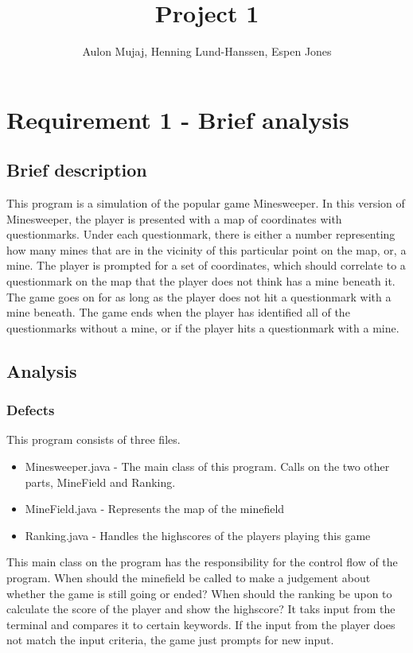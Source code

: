 \documentclass[UKenglish]{article}  %
\title{Project 1}        %
\author{Aulon Mujaj, Henning Lund-Hanssen, Espen Jones}                      %
\begin{document}
\maketitle{}

\section{Requirement 1 - Brief analysis}

\subsection{Brief description}
This program is a simulation of the popular game Minesweeper. In this version of
Minesweeper, the player is presented with a map of coordinates with
questionmarks. Under each questionmark, there is either a number representing
how many mines that are in the vicinity of this particular point on the map, or,
a mine. The player is prompted for a set of coordinates, which should correlate
to a questionmark on the map that the player does not think has a mine beneath
it. The game goes on for as long as the player does not hit a questionmark with
a mine beneath. The game ends when the player has identified all of the
questionmarks without a mine, or if the player hits a questionmark with a mine.
\subsection{Analysis}
\subsubsection{Defects}
This program consists of three files.

\begin{itemize}
    \item Minesweeper.java - The main class of this program. Calls on the two other parts, MineField and Ranking.
    \item MineField.java - Represents the map of the minefield
    \item Ranking.java - Handles the highscores of the players playing this game
\end{itemize}
This main class on the program has the responsibility for the control flow of the program. When should the minefield be
called to make a judgement about whether the game is still going or ended? When should the ranking be upon to calculate
the score of the player and show the highscore? It taks input from the terminal and compares it to certain keywords. If
the input from the player does not match the input criteria, the game just prompts for new input.
\end{document}
